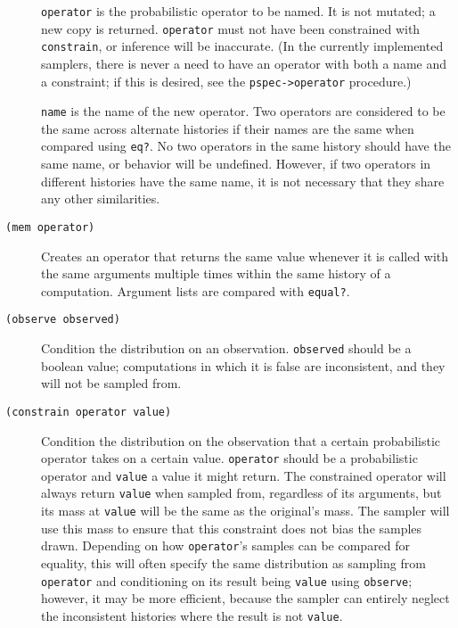 \documentclass{article}
\begin{document}
\begin{description}
    \texttt{operator} is the probabilistic operator to be named. It is
    not mutated; a new copy is returned. \texttt{operator} must not
    have been constrained with \texttt{constrain}, or inference will
    be inaccurate. (In the currently implemented samplers, there is
    never a need to have an operator with both a name and a
    constraint; if this is desired, see the \texttt{pspec->operator}
    procedure.)

    \texttt{name} is the name of the new operator. Two operators are
    considered to be the same across alternate histories if their
    names are the same when compared using \texttt{eq?}. No two
    operators in the same history should have the same name, or
    behavior will be undefined. However, if two operators in different
    histories have the same name, it is not necessary that they share
    any other similarities.

  \item[\texttt{(mem operator)}] \hfill

    Creates an operator that returns the same value whenever it is
    called with the same arguments multiple times within the same
    history of a computation. Argument lists are compared with
    \texttt{equal?}.

  \item[\texttt{(observe observed)}] \hfill

    Condition the distribution on an observation. \texttt{observed}
    should be a boolean value; computations in which it is false are
    inconsistent, and they will not be sampled from.

  \item[\texttt{(constrain operator value)}] \hfill

    Condition the distribution on the observation that a certain
    probabilistic operator takes on a certain value. \texttt{operator}
    should be a probabilistic operator and \texttt{value} a value it
    might return. The constrained operator will always return
    \texttt{value} when sampled from, regardless of its arguments, but
    its mass at \texttt{value} will be the same as the original's
    mass. The sampler will use this mass to ensure that this
    constraint does not bias the samples drawn. Depending on how
    \texttt{operator}'s samples can be compared for equality, this
    will often specify the same distribution as sampling from
    \texttt{operator} and conditioning on its result being
    \texttt{value} using \texttt{observe}; however, it may be more
    efficient, because the sampler can entirely neglect the
    inconsistent histories where the result is not \texttt{value}.


\end{description}
\end{document}

